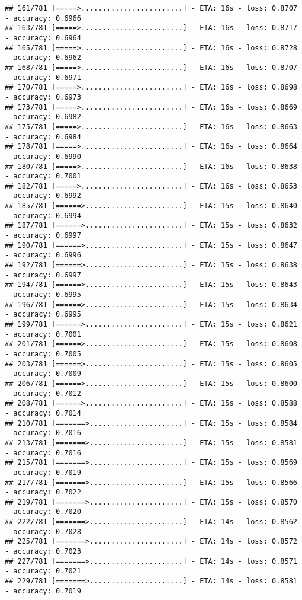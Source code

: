\documentclass[
]{article}
\begin{document}
\begin{verbatim}
## 161/781 [=====>........................] - ETA: 16s - loss: 0.8707 - accuracy: 0.6966
## 163/781 [=====>........................] - ETA: 16s - loss: 0.8717 - accuracy: 0.6964
## 165/781 [=====>........................] - ETA: 16s - loss: 0.8728 - accuracy: 0.6962
## 168/781 [=====>........................] - ETA: 16s - loss: 0.8707 - accuracy: 0.6971
## 170/781 [=====>........................] - ETA: 16s - loss: 0.8698 - accuracy: 0.6973
## 173/781 [=====>........................] - ETA: 16s - loss: 0.8669 - accuracy: 0.6982
## 175/781 [=====>........................] - ETA: 16s - loss: 0.8663 - accuracy: 0.6984
## 178/781 [=====>........................] - ETA: 16s - loss: 0.8664 - accuracy: 0.6990
## 180/781 [=====>........................] - ETA: 16s - loss: 0.8638 - accuracy: 0.7001
## 182/781 [=====>........................] - ETA: 16s - loss: 0.8653 - accuracy: 0.6992
## 185/781 [======>.......................] - ETA: 15s - loss: 0.8640 - accuracy: 0.6994
## 187/781 [======>.......................] - ETA: 15s - loss: 0.8632 - accuracy: 0.6997
## 190/781 [======>.......................] - ETA: 15s - loss: 0.8647 - accuracy: 0.6996
## 192/781 [======>.......................] - ETA: 15s - loss: 0.8638 - accuracy: 0.6997
## 194/781 [======>.......................] - ETA: 15s - loss: 0.8643 - accuracy: 0.6995
## 196/781 [======>.......................] - ETA: 15s - loss: 0.8634 - accuracy: 0.6995
## 199/781 [======>.......................] - ETA: 15s - loss: 0.8621 - accuracy: 0.7001
## 201/781 [======>.......................] - ETA: 15s - loss: 0.8608 - accuracy: 0.7005
## 203/781 [======>.......................] - ETA: 15s - loss: 0.8605 - accuracy: 0.7009
## 206/781 [======>.......................] - ETA: 15s - loss: 0.8600 - accuracy: 0.7012
## 208/781 [======>.......................] - ETA: 15s - loss: 0.8588 - accuracy: 0.7014
## 210/781 [=======>......................] - ETA: 15s - loss: 0.8584 - accuracy: 0.7016
## 213/781 [=======>......................] - ETA: 15s - loss: 0.8581 - accuracy: 0.7016
## 215/781 [=======>......................] - ETA: 15s - loss: 0.8569 - accuracy: 0.7019
## 217/781 [=======>......................] - ETA: 15s - loss: 0.8566 - accuracy: 0.7022
## 219/781 [=======>......................] - ETA: 15s - loss: 0.8570 - accuracy: 0.7020
## 222/781 [=======>......................] - ETA: 14s - loss: 0.8562 - accuracy: 0.7028
## 225/781 [=======>......................] - ETA: 14s - loss: 0.8572 - accuracy: 0.7023
## 227/781 [=======>......................] - ETA: 14s - loss: 0.8571 - accuracy: 0.7021
## 229/781 [=======>......................] - ETA: 14s - loss: 0.8581 - accuracy: 0.7019

\end{verbatim}
\end{document}
